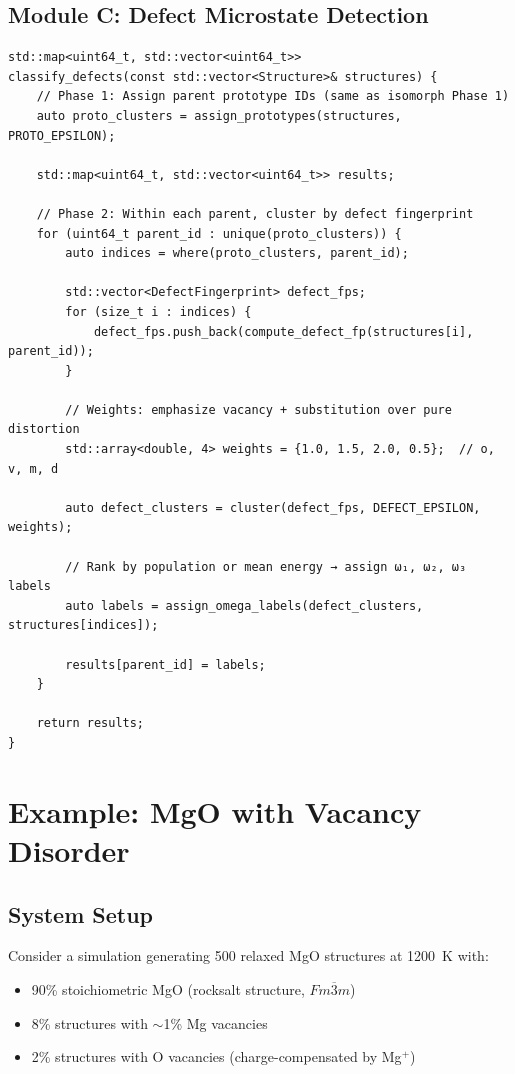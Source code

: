 \documentclass[11pt]{article}
\begin{document}
\subsection{Module C: Defect Microstate Detection}

\begin{lstlisting}[caption={Defect Classifier (Same Parent $\to$ Occupancy/Disorder Classes)}]
std::map<uint64_t, std::vector<uint64_t>>
classify_defects(const std::vector<Structure>& structures) {
    // Phase 1: Assign parent prototype IDs (same as isomorph Phase 1)
    auto proto_clusters = assign_prototypes(structures, PROTO_EPSILON);
    
    std::map<uint64_t, std::vector<uint64_t>> results;
    
    // Phase 2: Within each parent, cluster by defect fingerprint
    for (uint64_t parent_id : unique(proto_clusters)) {
        auto indices = where(proto_clusters, parent_id);
        
        std::vector<DefectFingerprint> defect_fps;
        for (size_t i : indices) {
            defect_fps.push_back(compute_defect_fp(structures[i], parent_id));
        }
        
        // Weights: emphasize vacancy + substitution over pure distortion
        std::array<double, 4> weights = {1.0, 1.5, 2.0, 0.5};  // o, v, m, d
        
        auto defect_clusters = cluster(defect_fps, DEFECT_EPSILON, weights);
        
        // Rank by population or mean energy → assign ω₁, ω₂, ω₃ labels
        auto labels = assign_omega_labels(defect_clusters, structures[indices]);
        
        results[parent_id] = labels;
    }
    
    return results;
}
\end{lstlisting}

\section{Example: MgO with Vacancy Disorder}

\subsection{System Setup}

Consider a simulation generating 500 relaxed MgO structures at 1200~K with:
\begin{itemize}
  \item 90\% stoichiometric MgO (rocksalt structure, $Fm\overline{3}m$)
  \item 8\% structures with $\sim$1\% Mg vacancies
  \item 2\% structures with O vacancies (charge-compensated by Mg$^+$)
\end{itemize}
\end{document}
